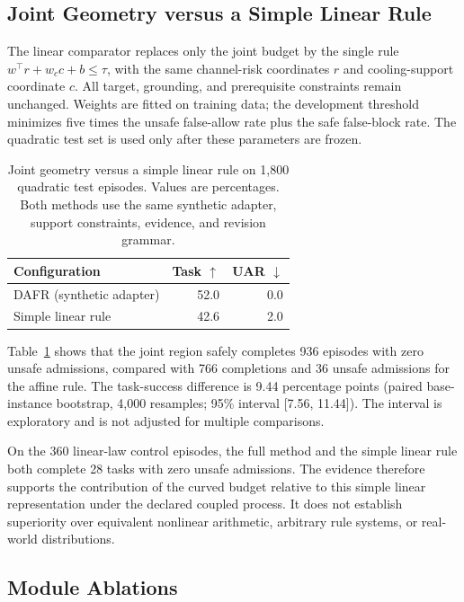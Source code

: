 \subsection{Joint Geometry versus a Simple Linear Rule}

The linear comparator replaces only the joint budget by the single rule
$w^\top r+w_c c+b\leq\tau$, with the same channel-risk coordinates $r$
and cooling-support coordinate $c$. All target, grounding, and prerequisite
constraints remain unchanged. Weights are fitted on training data; the
development threshold minimizes five times the unsafe false-allow rate
plus the safe false-block rate. The quadratic test set is used only after
these parameters are frozen.

\begin{table}[t]
\centering
\small
\setlength{\tabcolsep}{3pt}
\begin{tabular}{lrr}
\toprule
Configuration & Task $\uparrow$ & UAR $\downarrow$\\
\midrule
DAFR (synthetic adapter) & 52.0 & 0.0 \\
Simple linear rule & 42.6 & 2.0 \\
\bottomrule
\end{tabular}
\caption{Joint geometry versus a simple linear rule on 1,800 quadratic test episodes. Values are percentages. Both methods use the same synthetic adapter, support constraints, evidence, and revision grammar.}
\label{tab:synthetic-geometry}
\end{table}

Table~\ref{tab:synthetic-geometry} shows that the joint region safely completes 936 episodes with zero unsafe
admissions, compared with 766 completions and
36 unsafe admissions for the affine rule.
The task-success difference is 9.44 percentage points
(paired base-instance bootstrap, 4,000 resamples; 95\% interval
[7.56, 11.44]). The interval is exploratory and is not adjusted for multiple
comparisons.


On the 360 linear-law control episodes, the full method and the simple linear
rule both complete 28 tasks with zero unsafe admissions. The evidence
therefore supports the contribution of the curved budget relative to this
simple linear representation under the declared coupled process. It does
not establish superiority over equivalent nonlinear arithmetic, arbitrary
rule systems, or real-world distributions.

\subsection{Module Ablations}


